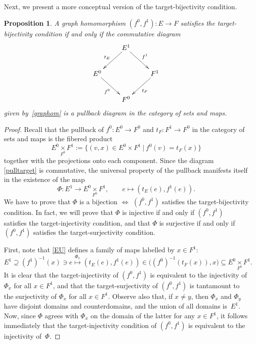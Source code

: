 \documentclass[12pt,times,a4paper]{amsart}
\newtheorem{proposition}[theorem]{Proposition}
\numberwithin{equation}{section}
\numberwithin{equation}{section}
\begin{document}
Next, we present a more conceptual version of the target-bijectivity condition.
\begin{proposition}\label{targetpull}
A graph homomorphism $(f^0,f^1):E\to F$ satisfies the target-bijectivity condition if and only if the commutative diagram
\begin{equation}\label{pulltarget}
\xymatrix{
&
E^1
\ar[dl]_{t_E}
\ar[dr]^{f^1}
&\\
E^0 \ar[dr]_{f^0}
& & 
F^1 \ar[dl]^{t_F}
\\
&
F^0
&
}
\end{equation}
given by~\eqref{graphom} is a pullback diagram in the category of sets and maps.
\end{proposition}
\begin{proof}
Recall that the pullback of $f^0:E^0\to F^0$ and $t_F:F^1\to F^0$ in the category of sets and maps is the fibered product
\begin{equation}
E^0\underset{F^0}{\times}F^1:=\{(v,x)\in E^0\times F^1~|~f^0(v)=t_F(x)\}
\end{equation}
together with the projections onto each component. Since the diagram \eqref{pulltarget} is commutative, the universal
property of the pullback manifests itself in the existence of the map
\begin{equation}
\Phi:E^1\longrightarrow E^0\underset{F^0}{\times}F^1,\qquad
e\longmapsto (t_E(e),f^1(e)).
\end{equation}
We have to prove that $\Phi$ is a bijection $\iff$ $(f^0,f^1)$ satisfies the target-bijectivity condition. In fact, we will prove that 
$\Phi$ is injective if and only if $(f^0,f^1)$ satisfies the target-injectivity condition, and that 
$\Phi$ is surjective if and only if $(f^0,f^1)$ satisfies the target-surjectivity condition.

First, note that \eqref{EU} defines a family of maps labelled by $x\in F^1$:
\begin{equation}
E^1\supseteq (f^1)^{-1}(x)\ni e\stackrel{\Phi_x}{\longmapsto}
 (t_E(e),f^1(e)) \in \big((f^0)^{-1}(t_F(x)),x\big)\subseteq E^0\underset{F^0}{\times}F^1.
\end{equation}
It is clear that the target-injectivity of $(f^0,f^1)$ is equivalent to the injectivity of $\Phi_x$ for all $x\in F^1$,
and that the target-surjectivity of $(f^0,f^1)$ is tantamount to the surjectivity of $\Phi_x$ for all $x\in F^1$.
Observe also that, if $x\neq y$, then $\Phi_x$ and $\Phi_y$ have disjoint domains and counterdomains, and the union of all domains 
is~$E^1$. Now, since $\Phi$ agrees with $\Phi_x$ on the domain of the latter for any $x\in F^1$, 
it follows immediately that the target-injectivity condition of $(f^0,f^1)$
is equivalent to the injectivity of~$\Phi$.


\end{proof}
\end{document}
